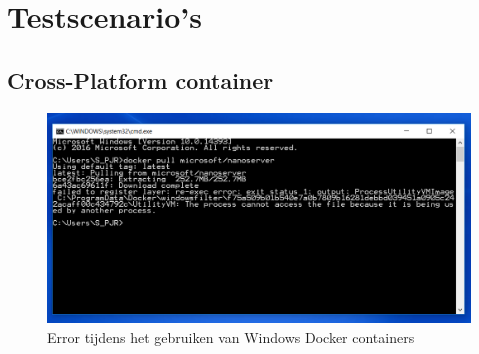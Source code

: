 \chapter{Testscenario's}\label{sec:testen}
\section{Cross-Platform container}\label{sec:crosscontainerscreen}

\begin{figure}
\centering
\includegraphics[width=\textwidth,height=\textheight,keepaspectratio]{afbeelding/testCrossContainer/bad_cut.png}
\caption{Error tijdens het gebruiken van Windows Docker containers}
\label{fig:testContainer:crosscontainer}
\end{figure}

\clearpage
